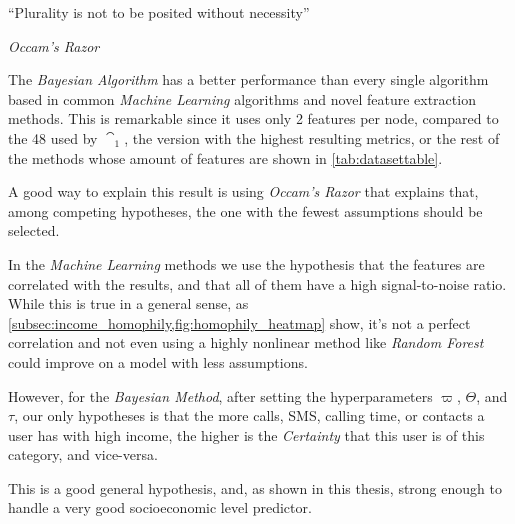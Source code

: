\epigraph{``Plurality is not to be posited without necessity''}{\textit{Occam's Razor}}

The \emph{Bayesian Algorithm} has a better performance than every single algorithm based in common \emph{Machine Learning} algorithms and novel feature extraction methods.
This is remarkable since it uses only 2 features per node, compared to the 48 used by $\cat_1$, the version with the highest resulting metrics, or the rest of the methods whose amount of features are shown in \cref{tab:datasettable}.

A good way to explain this result is using \emph{Occam's Razor} that explains that, among competing hypotheses, the one with the fewest assumptions should be selected.

In the \emph{Machine Learning} methods we use the hypothesis that the features are correlated with the results, and that all of them have a high signal-to-noise ratio.
While this is true in a general sense, as \cref{subsec:income_homophily,fig:homophily_heatmap} show, it's not a perfect correlation and not even using a highly nonlinear method like \emph{Random Forest} could improve on a model with less assumptions.

However, for the \emph{Bayesian Method}, after setting the hyperparameters $\varpi$, $\Theta$, and $\tau$, our only hypotheses is that the more calls, SMS, calling time, or contacts a user has with high income, the higher is the \emph{Certainty} that this user is of this category, and vice-versa.

This is a good general hypothesis, and, as shown in this thesis, strong enough to handle a very good socioeconomic level predictor.
